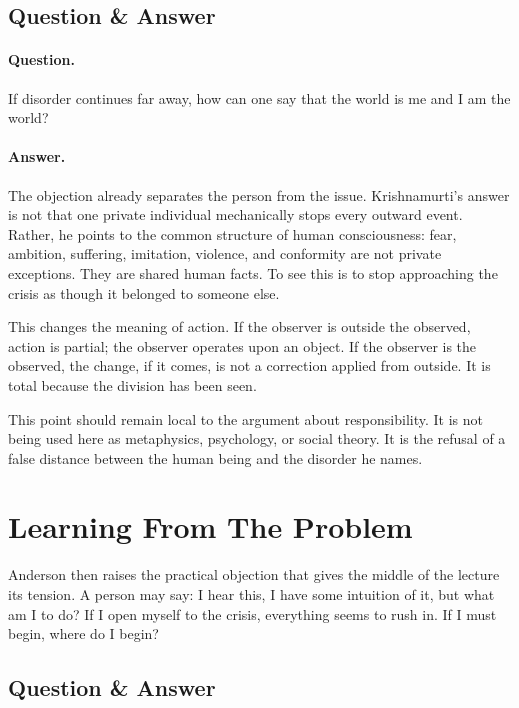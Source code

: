 \subsection{Question \& Answer}

\paragraph{Question.}
If disorder continues far away, how can one say that the world is me and I am the world?

\paragraph{Answer.}
The objection already separates the person from the issue. Krishnamurti's answer is not that one private individual mechanically stops every outward event. Rather, he points to the common structure of human consciousness: fear, ambition, suffering, imitation, violence, and conformity are not private exceptions. They are shared human facts. To see this is to stop approaching the crisis as though it belonged to someone else.

This changes the meaning of action. If the observer is outside the observed, action is partial; the observer operates upon an object. If the observer is the observed, the change, if it comes, is not a correction applied from outside. It is total because the division has been seen.

\begin{remark}
This point should remain local to the argument about responsibility. It is not being used here as metaphysics, psychology, or social theory. It is the refusal of a false distance between the human being and the disorder he names.
\end{remark}

\section{Learning From The Problem}

Anderson then raises the practical objection that gives the middle of the lecture its tension. A person may say: I hear this, I have some intuition of it, but what am I to do? If I open myself to the crisis, everything seems to rush in. If I must begin, where do I begin?

\subsection{Question \& Answer}

